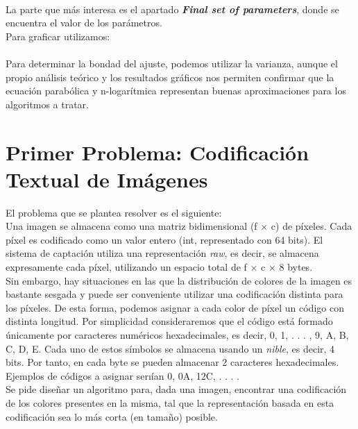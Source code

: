 \documentclass[a4paper,12pt,twoside]{article} %
\begin{document}
\\

La parte que más interesa es el apartado \textit{\textbf{Final set of parameters}}, donde se encuentra el valor de los parámetros.\\

Para graficar utilizamos:\\

\\

Para determinar la bondad del ajuste, podemos utilizar la varianza, aunque el propio análisis teórico y los resultados gráficos nos permiten confirmar que la ecuación parabólica y n-logarítmica representan buenas aproximaciones para los algoritmos a tratar.

\newpage


\section{Primer Problema: Codificación Textual de Imágenes}

El problema que se plantea resolver es el siguiente:\\

Una imagen se almacena como una matriz bidimensional (f × c) de píxeles. Cada píxel es codificado como un valor entero (int, representado con 64 bits). El sistema de captación utiliza una representación \textit{raw}, es decir, se almacena expresamente cada píxel, utilizando un espacio total de f × c × 8 bytes.\\

Sin embargo, hay situaciones en las que la distribución de colores de la imagen es bastante sesgada y puede ser conveniente utilizar una codificación distinta para los píxeles. De esta forma, podemos asignar a cada color de píxel un código con distinta longitud. Por simplicidad consideraremos que el código está formado únicamente por caracteres numéricos hexadecimales, es decir, {0, 1, . . . , 9, A, B, C, D, E}. Cada uno de estos símbolos se almacena usando un \textit{nible}, es decir, 4 bits. Por tanto, en cada byte se pueden almacenar 2 caracteres hexadecimales. Ejemplos de códigos a asignar serıían 0, 0A, 12C, . . . .\\

Se pide diseñar un algoritmo para, dada una imagen, encontrar una codificación de los colores presentes en la misma, tal que la representación basada en esta codificación sea lo más corta (en tamaño) posible.
\end{document}
